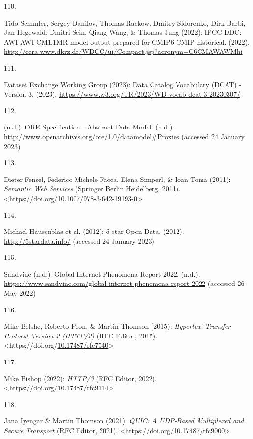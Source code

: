 \begin{thebibliography}{9}
\hypertarget{ref-DataInformationView}{}
110.

Tido Semmler, Sergey Danilov, Thomas Rackow, Dmitry Sidorenko, Dirk
Barbi, Jan Hegewald, Dmitri Sein, Qiang Wang, \& Thomas Jung (2022):
IPCC DDC: AWI AWI-CM1.1MR model output prepared for CMIP6 CMIP
historical. (2022).
\url{http://cera-www.dkrz.de/WDCC/ui/Compact.jsp?acronym=C6CMAWAWMhi}

\hypertarget{ref-w3-vocab-dcat-3}{}
111.

Dataset Exchange Working Group (2023): {Data Catalog Vocabulary ({DCAT})
- Version 3}. (2023).
\url{https://www.w3.org/TR/2023/WD-vocab-dcat-3-20230307/}

\hypertarget{ref-ORESpecificationAbstract}{}
112.

(n.d.): {ORE Specification} - {Abstract Data Model}. (n.d.).
\url{http://www.openarchives.org/ore/1.0/datamodel\#Proxies} (accessed
24 January 2023)

\hypertarget{ref-fenselSemanticWebServices2011}{}
113.

Dieter Fensel, Federico Michele Facca, Elena Simperl, \& Ioan Toma
(2011): \emph{Semantic {Web Services}} ({Springer Berlin Heidelberg},
2011).
\textless https://doi.org/\href{https://doi.org/10.1007/978-3-642-19193-0}{10.1007/978-3-642-19193-0}\textgreater{}

\hypertarget{ref-OpenData}{}
114.

Michael Hausenblas et al. (2012): 5-star {Open Data}. (2012).
\url{http://5stardata.info/} (accessed 24 January 2023)

\hypertarget{ref-sandvineGlobalInternetPhenomena}{}
115.

Sandvine (n.d.): Global {Internet Phenomena Report} 2022. (n.d.).
\url{https://www.sandvine.com/global-internet-phenomena-report-2022}
(accessed 26 May 2022)

\hypertarget{ref-rfc7540}{}
116.

Mike Belshe, Roberto Peon, \& Martin Thomson (2015): \emph{Hypertext
{Transfer Protocol Version} 2 ({HTTP}/2)} ({RFC Editor}, 2015).
\textless https://doi.org/\href{https://doi.org/10.17487/rfc7540}{10.17487/rfc7540}\textgreater{}

\hypertarget{ref-rfc9114}{}
117.

Mike Bishop (2022): \emph{{HTTP}/3} ({RFC} Editor, 2022).
\textless https://doi.org/\href{https://doi.org/10.17487/rfc9114}{10.17487/rfc9114}\textgreater{}

\hypertarget{ref-rfc9000}{}
118.

Jana Iyengar \& Martin Thomson (2021): \emph{{QUIC}: {A UDP-Based
Multiplexed} and {Secure Transport}} ({RFC Editor}, 2021).
\textless https://doi.org/\href{https://doi.org/10.17487/rfc9000}{10.17487/rfc9000}\textgreater{}


\end{thebibliography}
